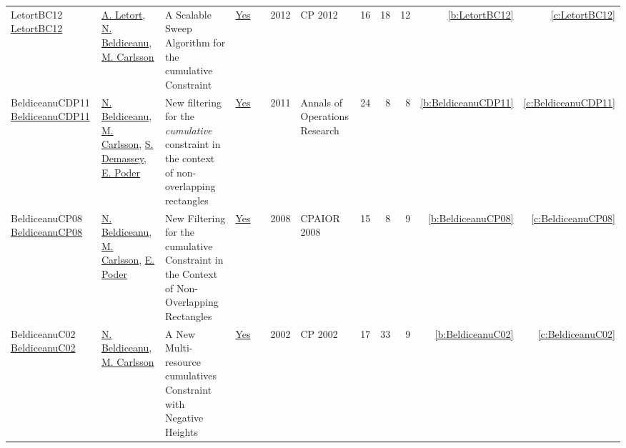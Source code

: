 {\begin{longtable}{>{\raggedright\arraybackslash}p{3cm}>{\raggedright\arraybackslash}p{6cm}>{\raggedright\arraybackslash}p{6.5cm}rrrp{2.5cm}rrrrr}
LetortBC12 \href{https://doi.org/10.1007/978-3-642-33558-7\_33}{LetortBC12} & \hyperref[auth:a128]{A. Letort}, \hyperref[auth:a129]{N. Beldiceanu}, \hyperref[auth:a91]{M. Carlsson} & A Scalable Sweep Algorithm for the cumulative Constraint & \href{../works/LetortBC12.pdf}{Yes} & \cite{LetortBC12} & 2012 & CP 2012 & 16 & 18 & 12 & \ref{b:LetortBC12} & \ref{c:LetortBC12}\\
BeldiceanuCDP11 \href{https://doi.org/10.1007/s10479-010-0731-0}{BeldiceanuCDP11} & \hyperref[auth:a129]{N. Beldiceanu}, \hyperref[auth:a91]{M. Carlsson}, \hyperref[auth:a246]{S. Demassey}, \hyperref[auth:a364]{E. Poder} & New filtering for the \emph{cumulative} constraint in the context of non-overlapping rectangles & \href{../works/BeldiceanuCDP11.pdf}{Yes} & \cite{BeldiceanuCDP11} & 2011 & Annals of Operations Research & 24 & 8 & 8 & \ref{b:BeldiceanuCDP11} & \ref{c:BeldiceanuCDP11}\\
BeldiceanuCP08 \href{https://doi.org/10.1007/978-3-540-68155-7\_5}{BeldiceanuCP08} & \hyperref[auth:a129]{N. Beldiceanu}, \hyperref[auth:a91]{M. Carlsson}, \hyperref[auth:a364]{E. Poder} & New Filtering for the cumulative Constraint in the Context of Non-Overlapping Rectangles & \href{../works/BeldiceanuCP08.pdf}{Yes} & \cite{BeldiceanuCP08} & 2008 & CPAIOR 2008 & 15 & 8 & 9 & \ref{b:BeldiceanuCP08} & \ref{c:BeldiceanuCP08}\\
BeldiceanuC02 \href{https://doi.org/10.1007/3-540-46135-3\_5}{BeldiceanuC02} & \hyperref[auth:a129]{N. Beldiceanu}, \hyperref[auth:a91]{M. Carlsson} & A New Multi-resource cumulatives Constraint with Negative Heights & \href{../works/BeldiceanuC02.pdf}{Yes} & \cite{BeldiceanuC02} & 2002 & CP 2002 & 17 & 33 & 9 & \ref{b:BeldiceanuC02} & \ref{c:BeldiceanuC02}\\
\end{longtable}
}

\clearpage

